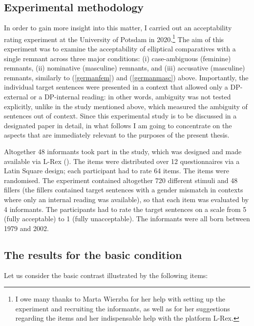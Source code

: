 \subsection{Experimental methodology} \label{sec:6experimental}
In order to gain more insight into this matter, I carried out an acceptability rating experiment at the University of Potsdam in 2020.\footnote{I owe many thanks to Marta Wierzba for her help with setting up the experiment and recruiting the informants, as well as for her suggestions regarding the items and her indispensable help with the platform L-Rex.} The aim of this experiment was to examine the acceptability of elliptical comparatives with a single remnant across three major conditions: (i) case-ambiguous (feminine) remnants, (ii) nominative (masculine) remnants, and (iii) accusative (masculine) remnants, similarly to (\ref{germanfem}) and (\ref{germanmasc}) above. Importantly, the individual target sentences were presented in a context that allowed only a DP-external or a DP-internal reading: in other words, ambiguity was not tested explicitly, unlike in the study mentioned above, which measured the ambiguity of sentences out of context. Since this experimental study is to be discussed in a designated paper in detail, in what follows I am going to concentrate on the aspects that are immediately relevant to the purposes of the present thesis.

Altogether 48 informants took part in the study, which was designed and made available via L-Rex (\citealt{lrex}). The items were distributed over 12 questionnaires via a Latin Square design; each participant had to rate 64 items. The items were randomised. The experiment contained altogether 720 different stimuli and 48 fillers (the fillers contained target sentences with a gender mismatch in contexts where only an internal reading was available), so that each item was evaluated by 4 informants. The participants had to rate the target sentences on a scale from 5 (fully acceptable) to 1 (fully unacceptable). The informants were all born between 1979 and 2002.

\subsection{The results for the basic condition} \label{sec:6results}
Let us consider the basic contrast illustrated by the following items:

